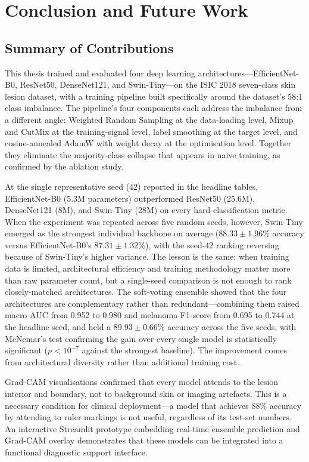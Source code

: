 \chapter{Conclusion and Future Work}

\section{Summary of Contributions}

This thesis trained and evaluated four deep learning architectures---EfficientNet-B0, ResNet50, DenseNet121, and Swin-Tiny---on the ISIC 2018 seven-class skin lesion dataset, with a training pipeline built specifically around the dataset's 58:1 class imbalance. The pipeline's four components each address the imbalance from a different angle: Weighted Random Sampling at the data-loading level, Mixup and CutMix at the training-signal level, label smoothing at the target level, and cosine-annealed AdamW with weight decay at the optimisation level. Together they eliminate the majority-class collapse that appears in naive training, as confirmed by the ablation study.

At the single representative seed (42) reported in the headline tables, EfficientNet-B0 (5.3M parameters) outperformed ResNet50 (25.6M), DenseNet121 (8M), and Swin-Tiny (28M) on every hard-classification metric. When the experiment was repeated across five random seeds, however, Swin-Tiny emerged as the strongest individual backbone on average ($88.33 \pm 1.96\%$ accuracy versus EfficientNet-B0's $87.31 \pm 1.32\%$), with the seed-42 ranking reversing because of Swin-Tiny's higher variance. The lesson is the same: when training data is limited, architectural efficiency and training methodology matter more than raw parameter count, but a single-seed comparison is not enough to rank closely-matched architectures. The soft-voting ensemble showed that the four architectures are complementary rather than redundant---combining them raised macro AUC from 0.952 to 0.980 and melanoma F1-score from 0.695 to 0.744 at the headline seed, and held a $89.93 \pm 0.66\%$ accuracy across the five seeds, with McNemar's test confirming the gain over every single model is statistically significant ($p < 10^{-7}$ against the strongest baseline). The improvement comes from architectural diversity rather than additional training cost.

Grad-CAM visualisations confirmed that every model attends to the lesion interior and boundary, not to background skin or imaging artefacts. This is a necessary condition for clinical deployment---a model that achieves 88\% accuracy by attending to ruler markings is not useful, regardless of its test-set numbers. An interactive Streamlit prototype embedding real-time ensemble prediction and Grad-CAM overlay demonstrates that these models can be integrated into a functional diagnostic support interface.

